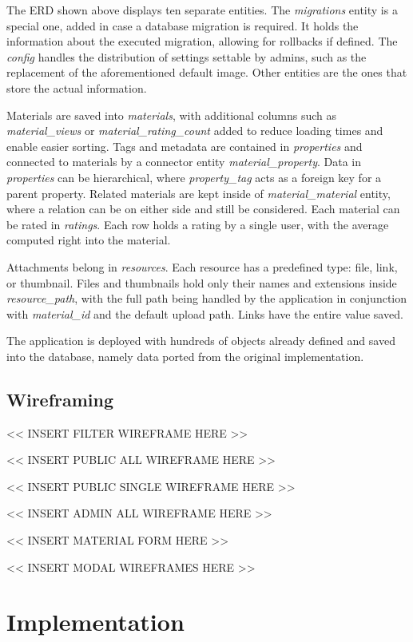 \documentclass[
  digital,     %
  oneside,     %
  nosansbold,  %
  colorbold, %
  lof,         %
  lot,         %
]{fithesis4}
\begin{document}
The ERD shown above displays ten separate entities. The \textit{migrations} entity is a special one, added in case a database migration is required. It holds the information about the executed migration, allowing for rollbacks if defined. The \textit{config} handles the distribution of settings settable by admins, such as the replacement of the aforementioned default image. Other entities are the ones that store the actual information.

Materials are saved into \textit{materials}, with additional columns such as \textit{material\_views} or \textit{material\_rating\_count} added to reduce loading times and enable easier sorting. Tags and metadata are contained in \textit{properties} and connected to materials by a connector entity \textit{material\_property}. Data in \textit{properties} can be hierarchical, where \textit{property\_tag} acts as a foreign key for a parent property. Related materials are kept inside of \textit{material\_material} entity, where a relation can be on either side and still be considered. Each material can be rated in \textit{ratings}. Each row holds a rating by a single user, with the average computed right into the material.

Attachments belong in \textit{resources}. Each resource has a predefined type: file, link, or thumbnail. Files and thumbnails hold only their names and extensions inside \textit{resource\_path}, with the full path being handled by the application in conjunction with \textit{material\_id} and the default upload path. Links have the entire value saved.

The application is deployed with hundreds of objects already defined and saved into the database, namely data ported from the original implementation.

\section{Wireframing}

<< INSERT FILTER WIREFRAME HERE >>

<< INSERT PUBLIC ALL WIREFRAME HERE >>

<< INSERT PUBLIC SINGLE WIREFRAME HERE >>

<< INSERT ADMIN ALL WIREFRAME HERE >>

<< INSERT MATERIAL FORM HERE >>

<< INSERT MODAL WIREFRAMES HERE >>

\chapter{Implementation}
\end{document}
